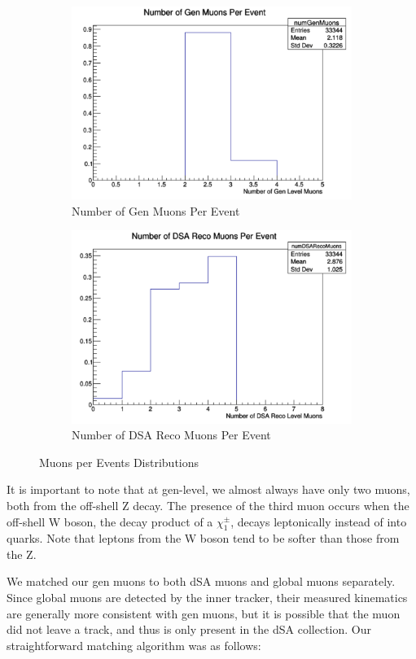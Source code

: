 \documentclass{article}
\begin{document}
\begin{figure} [H]
\begin{subfigure}{.5\textwidth}
  \centering
  \includegraphics[width=.8\linewidth]{GenMuons.png}  
  \caption{Number of Gen Muons Per Event}
  \label{fig:sub-first2}
\end{subfigure}
\begin{subfigure}{.5\textwidth}
  \centering
  \includegraphics[width=.8\linewidth]{DSAMuons.png}  
  \caption{Number of DSA Reco Muons Per Event}
  \label{fig:sub-second2}
\end{subfigure}
\caption{Muons per Events Distributions}
\label{fig:10}
\end{figure}
\par
It is important to note that at gen-level, we almost always have only two muons, both from the off-shell Z decay. The presence of the third muon occurs when the off-shell W boson, the decay product of a $\chi_{1}^{\pm}$, decays leptonically instead of into quarks. Note that leptons from the W boson tend to be softer than those from the Z.
\par
We matched our gen muons to both dSA muons and global muons separately. Since global muons are detected by the inner tracker, their measured kinematics are generally more consistent with gen muons, but it is possible that the muon did not leave a track, and thus is only present in the dSA collection. Our straightforward matching algorithm was as follows:
\end{document}
